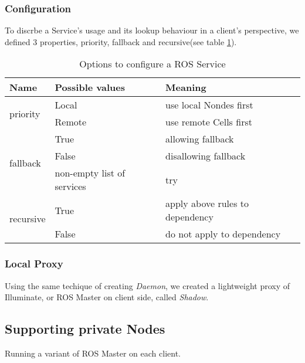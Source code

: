 \subsubsection{Configuration}
To discrbe a Service's usage and its lookup behaviour in a client's perspective, we defined 3 properties, priority, fallback and recursive(see table \ref{table:srv-opt}).

\begin{table}
    \renewcommand{\arraystretch}{1.3}
    \caption{Options to configure a ROS Service}
    \label{table:srv-opt}
    \centering
    \begin{tabular}{|l|l|l|}
        \hline
        \bfseries Name & \bfseries Possible values & \bfseries Meaning \\
        \hline
        \multirow{2}{*}{priority}  & Local  & use local Nondes first \\
        \cline{2-3}
                                   & Remote & use remote Cells first \\
        \hline
        \multirow{3}{*}{fallback}  & True   & allowing fallback \\
        \cline{2-3}
                                   & False  & disallowing fallback \\
        \cline{2-3}
                                   & non-empty list of services & try  \\
        \hline
        \multirow{2}{*}{recursive} & True   & apply above rules to dependency \\
        \cline{2-3}
                                   & False  & do not apply to dependency \\
        \hline
    \end{tabular}
\end{table} 

\subsubsection{Local Proxy}
Using the same techique of creating \emph{Daemon}, we created a lightweight proxy of Illuminate, or ROS Master on client side, called \emph{Shadow}.

\subsection{Supporting private Nodes}
Running a variant of ROS Master on each client.


